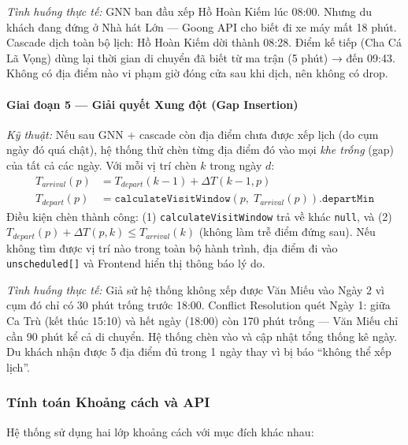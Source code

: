 \documentclass[12pt,a4paper]{article}
\begin{document}
\medskip
\textit{Tình huống thực tế:} GNN ban đầu xếp Hồ Hoàn Kiếm lúc 08:00. Nhưng
du khách đang đứng ở Nhà hát Lớn --- Goong API cho biết đi xe máy mất 18 phút.
Cascade dịch toàn bộ lịch: Hồ Hoàn Kiếm dời thành 08:28. Điểm kế tiếp (Cha Cá
Lã Vọng) dùng lại thời gian di chuyển đã biết từ ma trận (5 phút) → đến 09:43.
Không có địa điểm nào vi phạm giờ đóng cửa sau khi dịch, nên không có drop.

\paragraph{Giai đoạn 5 --- Giải quyết Xung đột (Gap Insertion)}

\textit{Kỹ thuật:} Nếu sau GNN + cascade còn địa điểm chưa được xếp lịch (do
cụm ngày đó quá chật), hệ thống thử chèn từng địa điểm đó vào mọi \textit{khe
trống} (gap) của tất cả các ngày. Với mỗi vị trí chèn $k$ trong ngày $d$:
\begin{align}
  T_{arrival}(p) &= T_{depart}(k-1) + \Delta T(k-1, p) \\
  T_{depart}(p)  &= \texttt{calculateVisitWindow}(p,\; T_{arrival}(p))\texttt{.departMin}
\end{align}
Điều kiện chèn thành công: (1) \texttt{calculateVisitWindow} trả về khác
\texttt{null}, và (2) $T_{depart}(p) + \Delta T(p, k) \le T_{arrival}(k)$
(không làm trễ điểm đứng sau). Nếu không tìm được vị trí nào trong toàn bộ
hành trình, địa điểm đi vào \texttt{unscheduled[]} và Frontend hiển thị thông
báo lý do.

\medskip
\textit{Tình huống thực tế:} Giả sử hệ thống không xếp được Văn Miếu vào Ngày
2 vì cụm đó chỉ có 30 phút trống trước 18:00. Conflict Resolution quét Ngày 1:
giữa Ca Trù (kết thúc 15:10) và hết ngày (18:00) còn 170 phút trống ---
Văn Miếu chỉ cần 90 phút kể cả di chuyển. Hệ thống chèn vào và cập nhật tổng
thống kê ngày. Du khách nhận được 5 địa điểm đủ trong 1 ngày thay vì bị báo
``không thể xếp lịch''.

\subsubsection{Tính toán Khoảng cách và API}

Hệ thống sử dụng hai lớp khoảng cách với mục đích khác nhau:
\end{document}
